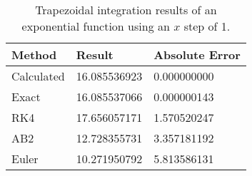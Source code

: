 \begin{singlespace}
\begin{table}[H]
	\centering
	\begin{tabular}{@{} l l l  @{}} 	
		\toprule %
		\footnotesize %
		\raggedright %
		Method	&		Result & Absolute Error		\\
		\midrule		
%
Calculated & 	16.085536923 &	0.000000000 \\
Exact & 	16.085537066 &	0.000000143 \\
RK4 & 	17.656057171 &	1.570520247 \\
AB2 &	12.728355731 &	3.357181192 \\
Euler & 	10.271950792 &	5.813586131 \\
%
		\bottomrule
	\end{tabular}
	\caption{Trapezoidal integration results of an exponential function using an $x$ step of 1.}
	\label{tab: trap exp res}
\end{table}
\end{singlespace}
	
	